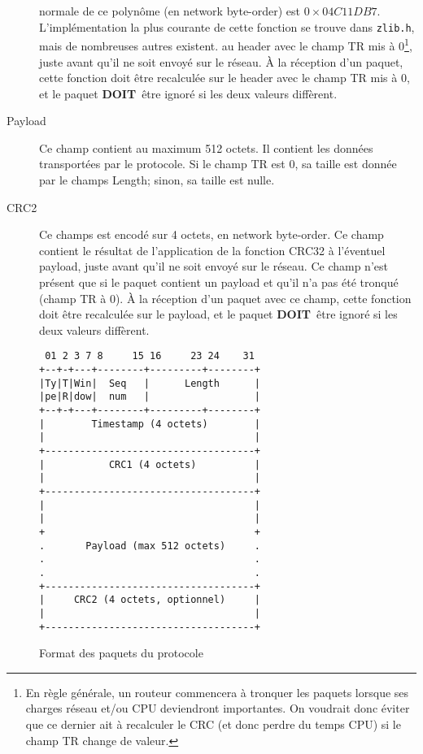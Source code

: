 \documentclass[a4paper,12pt]{article}
\newcommand{\must}{\textbf{DOIT}}
\begin{document}
\begin{description}
{    	normale de ce polynôme (en network byte-order) est $0\times04C11DB7$. L'implémentation
    	la plus courante de cette fonction se trouve dans \texttt{zlib.h}, mais de nombreuses
    	autres existent.}
    au header avec le champ TR mis à 0\footnote{En règle générale, un routeur commencera à tronquer les paquets lorsque ses charges réseau et/ou CPU deviendront importantes. On voudrait donc éviter que ce dernier ait à recalculer le CRC (et donc perdre du temps CPU) si le champ TR change de valeur.}, juste avant qu'il ne soit envoyé sur le réseau.
    À la réception d'un paquet, cette fonction doit être recalculée sur le header avec le champ TR mis à 0, et 
    le paquet \must\ être ignoré si les deux valeurs diffèrent.
    \item[Payload] Ce champ contient au maximum 512 octets.
        Il contient les données transportées par le protocole. Si le champ TR est 0, sa taille est
        donnée par le champs Length; sinon, sa taille est nulle. 
    \item[CRC2] Ce champs est encodé sur 4 octets, en network byte-order.
        Ce champ contient le résultat de l'application de la fonction
        CRC32 à l'éventuel payload, juste avant qu'il ne soit envoyé sur le réseau.
        Ce champ n'est présent que si le paquet contient un payload et qu'il n'a pas été tronqué (champ TR à 0).
        À la réception d'un paquet avec ce champ, cette fonction doit être recalculée sur le payload, et 
        le paquet \must\ être ignoré si les deux valeurs diffèrent.
\end{description}
\begin{figure}
    \centering
    \begin{minipage}{50ex}
\begin{verbatim}
 01 2 3 7 8     15 16     23 24    31
+--+-+---+--------+---------+--------+
|Ty|T|Win|  Seq   |      Length      |
|pe|R|dow|  num   |                  |
+--+-+---+--------+---------+--------+
|        Timestamp (4 octets)        |
|                                    |
+------------------------------------+
|           CRC1 (4 octets)          |
|                                    |
+------------------------------------+
|                                    |
|                                    |
+                                    +
.       Payload (max 512 octets)     .
.                                    .
.                                    .
+------------------------------------+
|     CRC2 (4 octets, optionnel)     |
|                                    |
+------------------------------------+
\end{verbatim}
    \end{minipage}
    \caption{Format des paquets du protocole}\label{fig:format}
\end{figure}
\end{document}
